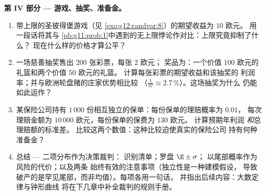 \begin{problem}
\medskip
\noindent\textbf{第 IV 部分 --- 游戏、抽奖、准备金。}
\begin{enumerate}[resume]
  \item 带上限的圣彼得堡游戏（见
        \cref{exo:g12:randvar:8}）的期望收益为 $10$ 欧元。
        用一段话将其与
        \cref{pb:g11:prob:1}中遇到的无上限悖论作对比：上限究竟抑制了什么？
        现在什么样的价格才算公平？
  \item 一场慈善抽奖售出 $200$ 张彩票，每张 $2$ 欧元；
        奖品为：一个价值 $100$ 欧元的礼篮和两个价值 $50$ 欧元的礼篮。
        计算每张彩票的期望收益和该抽奖的
        利润率；并与欧洲轮盘赌的庄家优势相比较
        （$\frac{1}{37} \approx 2.7\,\%$）。这场抽奖为什么
        仍能如此运作？
  \item 某保险公司持有 $1\,000$ 份相互独立的保单：每份保单的理赔概率为 $0.01$，
        每次理赔金额为 $10\,000$ 欧元，每份保单的保费为 $130$ 欧元。
        计算预期年利润
        \emph{和}总理赔额的标准差。
        比较这两个数值：这种比较迫使真实的保险公司
        持有何种准备金？
  \item 总结 --- 二项分布作为决策裁判：
        识别清单；罗盘 $\E \pm \sigma$；
        以尾部概率作为风险的代价；以及两条
        始终有效的注意事项（独立性是一种建模假设，
        导致破产的是罕见尾部，而非均值）。每项各用一句话，
        并指出后续内容：大数定律与钟形曲线
        将在下几章中补全裁判的规则手册。
\end{enumerate}
\end{problem}
